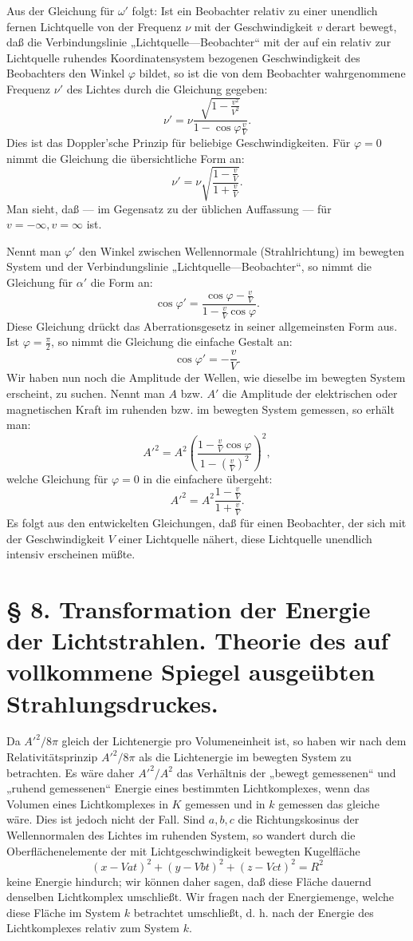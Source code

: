 \documentclass[17pt]{webarticle}       %
\begin{document}
Aus der Gleichung für \(\omega'\) folgt: Ist ein Beobachter relativ zu einer unendlich fernen Lichtquelle von der Frequenz \( \nu \) mit der Geschwindigkeit \( v \) derart bewegt, daß die Verbindungslinie „Lichtquelle—Beobachter“ mit der auf ein relativ zur Lichtquelle ruhendes Koordinatensystem bezogenen Geschwindigkeit des Beobachters den Winkel \(\varphi\) bildet, so ist die von dem Beobachter wahrgenommene Frequenz \( \nu' \) des Lichtes durch die Gleichung gegeben:
\[
\nu' = \nu \frac{\sqrt{1 - \frac{v^2}{V^2}}}{1 - \cos \varphi \frac{v}{V}}.
\]
Dies ist das Doppler'sche Prinzip für beliebige Geschwindigkeiten. Für \(\varphi = 0\) nimmt die Gleichung die übersichtliche Form an:
\[
\nu' = \nu \sqrt{\frac{1 - \frac{v}{V}}{1 + \frac{v}{V}}}.
\]
Man sieht, daß — im Gegensatz zu der üblichen Auffassung — für \( v = -\infty, v = \infty \) ist.

Nennt man \(\varphi'\) den Winkel zwischen Wellennormale (Strahlrichtung) im bewegten System und der Verbindungslinie „Lichtquelle—Beobachter“, so nimmt die Gleichung für \(\alpha'\) die Form an:
\[
\cos \varphi' = \frac{\cos \varphi - \frac{v}{V}}{1 - \frac{v}{V} \cos \varphi}.
\]
Diese Gleichung drückt das Aberrationsgesetz in seiner allgemeinsten Form aus. Ist \(\varphi = \frac{\pi}{2}\), so nimmt die Gleichung die einfache Gestalt an:
\[
\cos \varphi' = -\frac{v}{V}.
\]
Wir haben nun noch die Amplitude der Wellen, wie dieselbe im bewegten System erscheint, zu suchen. Nennt man \( A \) bzw. \( A' \) die Amplitude der elektrischen oder magnetischen Kraft im ruhenden bzw. im bewegten System gemessen, so erhält man:
\[
A'^2 = A^2 \left( \frac{1 - \frac{v}{V} \cos \varphi}{1 - \left( \frac{v}{V} \right)^2} \right)^2,
\]
welche Gleichung für \(\varphi = 0\) in die einfachere übergeht:
\[
A'^2 = A^2 \frac{1 - \frac{v}{V}}{1 + \frac{v}{V}}.
\]
Es folgt aus den entwickelten Gleichungen, daß für einen Beobachter, der sich mit der Geschwindigkeit \( V \) einer Lichtquelle nähert, diese Lichtquelle unendlich intensiv erscheinen müßte.

\section*{§ 8. Transformation der Energie der Lichtstrahlen. Theorie des auf vollkommene Spiegel ausgeübten Strahlungsdruckes.}
Da \( A'^2 / 8\pi \) gleich der Lichtenergie pro Volumeneinheit ist, so haben wir nach dem Relativitätsprinzip \( A'^2 / 8\pi \) als die Lichtenergie im bewegten System zu betrachten. Es wäre daher \( A'^2 / A^2 \) das Verhältnis der „bewegt gemessenen“ und „ruhend gemessenen“ Energie eines bestimmten Lichtkomplexes, wenn das Volumen eines Lichtkomplexes in \( K \) gemessen und in \( k \) gemessen das gleiche wäre. Dies ist jedoch nicht der Fall. Sind \( a, b, c \) die Richtungskosinus der Wellennormalen des Lichtes im ruhenden System, so wandert durch die Oberflächenelemente der mit Lichtgeschwindigkeit bewegten Kugelfläche
\[
(x - Va t)^2 + (y - Vb t)^2 + (z - Vc t)^2 = R^2
\]
keine Energie hindurch; wir können daher sagen, daß diese Fläche dauernd denselben Lichtkomplex umschließt. Wir fragen nach der Energiemenge, welche diese Fläche im System \( k \) betrachtet umschließt, d. h. nach der Energie des Lichtkomplexes relativ zum System \( k \).
\end{document}
